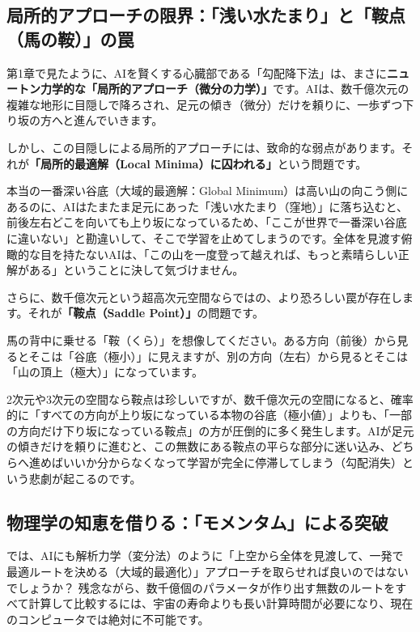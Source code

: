 \subsection{局所的アプローチの限界：「浅い水たまり」と「鞍点（馬の鞍）」の罠}

第1章で見たように、AIを賢くする心臓部である「勾配降下法」は、まさに\textbf{ニュートン力学的な「局所的アプローチ（微分の力学）」}です。AIは、数千億次元の複雑な地形に目隠しで降ろされ、足元の傾き（微分）だけを頼りに、一歩ずつ下り坂の方へと進んでいきます。

しかし、この目隠しによる局所的アプローチには、致命的な弱点があります。それが\textbf{「局所的最適解（Local Minima）に囚われる」}という問題です。

本当の一番深い谷底（大域的最適解：Global Minimum）は高い山の向こう側にあるのに、AIはたまたま足元にあった「浅い水たまり（窪地）」に落ち込むと、前後左右どこを向いても上り坂になっているため、「ここが世界で一番深い谷底に違いない」と勘違いして、そこで学習を止めてしまうのです。全体を見渡す俯瞰的な目を持たないAIは、「この山を一度登って越えれば、もっと素晴らしい正解がある」ということに決して気づけません。

さらに、数千億次元という超高次元空間ならではの、より恐ろしい罠が存在します。それが\textbf{「鞍点（Saddle Point）」}の問題です。

馬の背中に乗せる「鞍（くら）」を想像してください。ある方向（前後）から見るとそこは「谷底（極小）」に見えますが、別の方向（左右）から見るとそこは「山の頂上（極大）」になっています。

2次元や3次元の空間なら鞍点は珍しいですが、数千億次元の空間になると、確率的に「すべての方向が上り坂になっている本物の谷底（極小値）」よりも、「一部の方向だけ下り坂になっている鞍点」の方が圧倒的に多く発生します。AIが足元の傾きだけを頼りに進むと、この無数にある鞍点の平らな部分に迷い込み、どちらへ進めばいいか分からなくなって学習が完全に停滞してしまう（勾配消失）という悲劇が起こるのです。

\subsection{物理学の知恵を借りる：「モメンタム」による突破}

では、AIにも解析力学（変分法）のように「上空から全体を見渡して、一発で最適ルートを決める（大域的最適化）」アプローチを取らせれば良いのではないでしょうか？ 残念ながら、数千億個のパラメータが作り出す無数のルートをすべて計算して比較するには、宇宙の寿命よりも長い計算時間が必要になり、現在のコンピュータでは絶対に不可能です。

